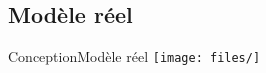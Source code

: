 \subsection{Modèle réel}
\begin{frame}{Conception}{Modèle réel}
\texttt{[image: files/]}
\end{frame}
